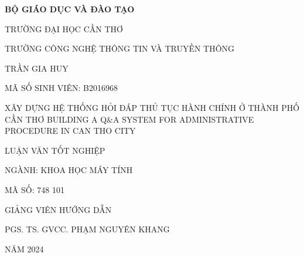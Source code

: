 \begin{center}
    \bf BỘ GIÁO DỤC VÀ ĐÀO TẠO

    TRƯỜNG ĐẠI HỌC CẦN THƠ

    TRƯỜNG CÔNG NGHỆ THÔNG TIN VÀ TRUYỀN THÔNG

    \vspace{2cm}

    TRẦN GIA HUY

    MÃ SỐ SINH VIÊN: B2016968

    \vspace{2cm}

    {\large
        XÂY DỰNG HỆ THỐNG HỎI ĐÁP THỦ TỤC HÀNH CHÍNH Ở THÀNH PHỐ CẦN THƠ
        \vspace{1cm}
        BUILDING A Q\&A SYSTEM FOR ADMINISTRATIVE PROCEDURE IN CAN THO CITY
    }

    \vspace{2cm}

    LUẬN VĂN TỐT NGHIỆP

    NGÀNH: KHOA HỌC MÁY TÍNH

    MÃ SỐ: 748 101

    \vspace{2cm}

    GIẢNG VIÊN HƯỚNG DẪN

    PGS. TS. GVCC. PHẠM NGUYÊN KHANG

    \vspace{4cm}

    NĂM 2024
\end{center}